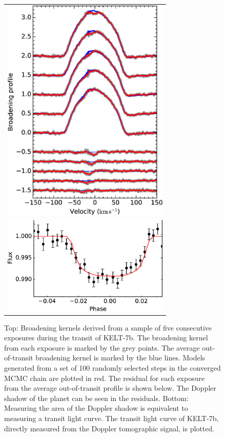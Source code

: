 \documentclass[useAMS,usenatbib]{mn2e}
\begin{document}
\begin{figure}
  \begin{tabular}{c}
  \includegraphics[width=8cm]{plots/KELT-7/vprof.eps}\\
  \includegraphics[width=8cm]{plots/KELT-7/lc_ccfprofile.pkl.eps}
  \end{tabular}
  \caption{\label{fig:vprof_KELT7}Top: Broadening kernels derived from a sample of five consecutive exposures during the transit of KELT-7b. The broadening kernel from each exposure is marked by the grey points. The average out-of-transit broadening kernel is marked by the blue lines. Models generated from a set of 100 randomly selected steps in the converged MCMC chain are plotted in red. The residual for each exposure from the average out-of-transit profile is shown below. The Doppler shadow of the planet can be seen in the residuals. Bottom: Measuring the area of the Doppler shadow is equivalent to measuring a transit light curve. The transit light curve of KELT-7b, directly measured from the Doppler tomographic signal, is plotted. }
\end{figure}
\end{document}
